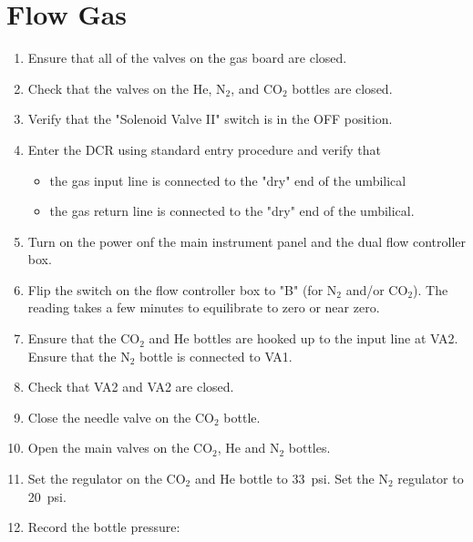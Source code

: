 \section{Flow Gas}
\begin{enumerate}
\item \CheckBox[name=gflow1]{} Ensure that all of the valves on the gas board are closed.
\item \CheckBox[name=gflow2]{} Check that the valves on the He, N$_{2}$, and CO$_{2}$ bottles are closed.
\item \CheckBox[name=gflow3]{} Verify that the "Solenoid Valve II" switch is in the OFF position.
\item \CheckBox[name=gflow4]{} Enter the DCR using standard entry procedure and verify that
	\begin{itemize}
	\item \CheckBox[name=gflow5]{} the gas input line is connected to the "dry" end of the umbilical
	\item \CheckBox[name=gflow6]{} the gas return line is connected to the "dry" end of the umbilical.
	\end{itemize}
\item \CheckBox[name=gflow7]{} Turn on the power onf the main instrument panel and the dual flow controller box.
\item \CheckBox[name=gflow8]{} Flip the switch on the flow controller box to "B" (for N$_{2}$ and/or CO$_{2}$). The reading takes a few minutes to equilibrate to zero or near zero. 
\item \CheckBox[name=gflow9]{} Ensure that the CO$_{2}$ and He bottles are hooked up to the input line at VA2. Ensure that the N$_{2}$ bottle is connected to VA1.
\item \CheckBox[name=gflow10]{} Check that VA2 and VA2 are closed.
\item \CheckBox[name=gflow11]{} Close the needle valve on the CO$_2$ bottle.
\item \CheckBox[name=gflow12]{} Open the main valves on the CO$_{2}$, He and N$_{2}$ bottles.
\item \CheckBox[name=gflow13]{} Set the regulator on the CO$_{2}$ and He bottle to 33~psi. Set the N$_{2}$ regulator to 20~psi.
\item \CheckBox[name=gflow14]{} Record the bottle pressure:
\begin{center}
\begin{tabular}{|c|c|}

\end{tabular}
\end{center}
\end{enumerate}
